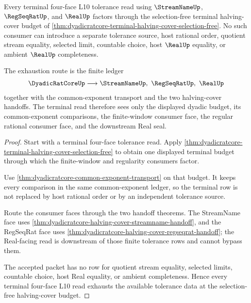 \begin{theorem}
\label{thm:dyadicratcore-terminal-halving-cover-exhaustion}
Every terminal four-face L10 tolerance read using $\StreamNameUp$, $\RegSeqRatUp$, and $\RealUp$ factors through the selection-free terminal halving-cover budget of \autoref{thm:dyadicratcore-terminal-halving-cover-selection-free}. No such consumer can introduce a separate tolerance source, host rational order, quotient stream equality, selected limit, countable choice, host $\RealUp$ equality, or ambient $\RealUp$ completeness.

The exhaustion route is the finite ledger
$$
\DyadicRatCoreUp \longrightarrow \StreamNameUp,\ \RegSeqRatUp,\ \RealUp
$$
together with the common-exponent transport and the two halving-cover handoffs. The terminal read therefore sees only the displayed dyadic budget, its common-exponent comparisons, the finite-window consumer face, the regular rational consumer face, and the downstream Real seal.
\end{theorem}
\begin{proof}
Start with a terminal four-face tolerance read. Apply \autoref{thm:dyadicratcore-terminal-halving-cover-selection-free} to obtain one displayed terminal budget through which the finite-window and regularity consumers factor.

Use \autoref{thm:dyadicratcore-common-exponent-transport} on that budget. It keeps every comparison in the same common-exponent ledger, so the terminal row is not replaced by host rational order or by an independent tolerance source.

Route the consumer faces through the two handoff theorems. The StreamName face uses \autoref{thm:dyadicratcore-halving-cover-streamname-handoff}, and the RegSeqRat face uses \autoref{thm:dyadicratcore-halving-cover-regseqrat-handoff}; the Real-facing read is downstream of those finite tolerance rows and cannot bypass them.

The accepted packet has no row for quotient stream equality, selected limits, countable choice, host Real equality, or ambient completeness. Hence every terminal four-face L10 read exhausts the available tolerance data at the selection-free halving-cover budget.
\end{proof}

